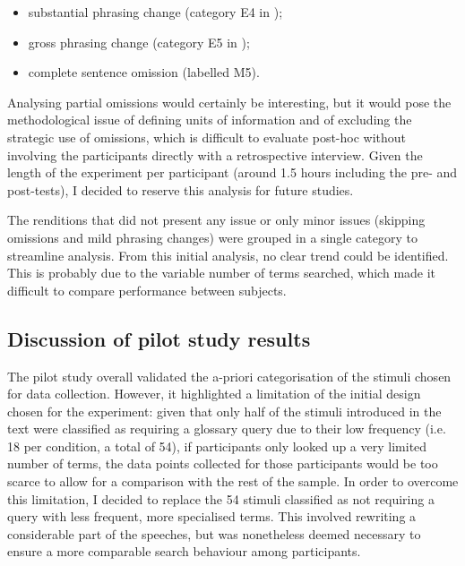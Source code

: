 \begin{itemize}
    \item substantial phrasing change (category E4 in \citealt{barik_description_1971});
    \item gross phrasing change (category E5 in \citealt{barik_description_1971});
    \item complete sentence omission (labelled M5).
\end{itemize}
Analysing partial omissions would certainly be interesting, but it would pose the methodological issue of defining units of information and of excluding the strategic use of omissions, which is difficult to evaluate post-hoc without involving the participants directly with a retrospective interview. Given the length of the experiment per participant (around 1.5 hours including the pre- and post-tests), I decided to reserve this analysis for future studies.

The renditions that did not present any issue or only minor issues (skipping omissions and mild phrasing changes) were grouped in a single category to streamline analysis. From this initial analysis, no clear trend could be identified. This is probably due to the variable number of terms searched, which made it difficult to compare performance between subjects.
\subsection{Discussion of pilot study results} \label{discussion_PS}
The pilot study overall validated the a-priori categorisation of the stimuli chosen for data collection. However, it highlighted a limitation of the initial design chosen for the experiment: given that only half of the stimuli introduced in the text were classified as requiring a glossary query due to their low frequency (i.e. 18 per condition, a total of 54), if participants only looked up a very limited number of terms, the data points collected for those participants would be too scarce to allow for a comparison with the rest of the sample. In order to overcome this limitation, I decided to replace the 54 stimuli classified as not requiring a query with less frequent, more specialised terms. This involved rewriting a considerable part of the speeches, but was nonetheless deemed necessary to ensure a more comparable search behaviour among participants.

